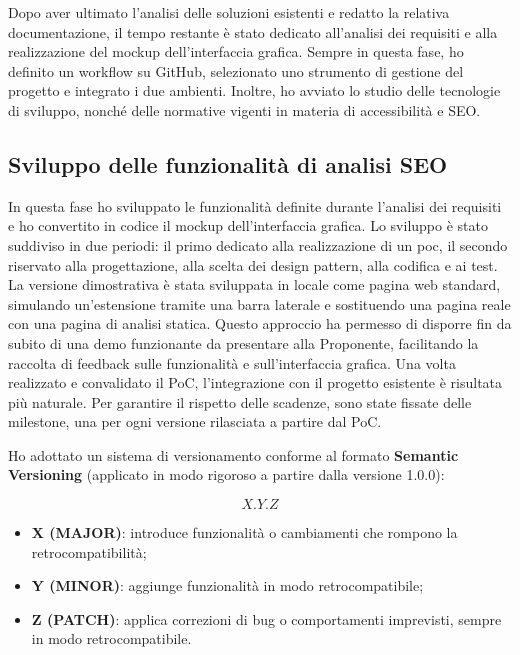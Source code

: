 \par\noindent Dopo aver ultimato l’analisi delle soluzioni esistenti e redatto la relativa documentazione, il tempo restante è stato dedicato all’analisi dei requisiti e alla realizzazione del mockup dell’interfaccia grafica. Sempre in questa fase, ho definito un workflow su GitHub, selezionato uno strumento di gestione del progetto e integrato i due ambienti. Inoltre, ho avviato lo studio delle tecnologie di sviluppo, nonché delle normative vigenti in materia di accessibilità e SEO.

\subsection{Sviluppo delle funzionalità di analisi SEO}

\par In questa fase ho sviluppato le funzionalità definite durante l’analisi dei requisiti e ho convertito in codice il mockup dell’interfaccia grafica. Lo sviluppo è stato suddiviso in due periodi: il primo dedicato alla realizzazione di un \gls{poc}, il secondo riservato alla progettazione, alla scelta dei design pattern, alla codifica e ai test. La versione dimostrativa è stata sviluppata in locale come pagina web standard, simulando un’estensione tramite una barra laterale e sostituendo una pagina reale con una pagina di analisi statica. Questo approccio ha permesso di disporre fin da subito di una demo funzionante da presentare alla Proponente, facilitando la raccolta di feedback sulle funzionalità e sull’interfaccia grafica. Una volta realizzato e convalidato il PoC, l’integrazione con il progetto esistente è risultata più naturale. Per garantire il rispetto delle scadenze, sono state fissate delle milestone, una per ogni versione rilasciata a partire dal PoC.

\vspace{10pt}
\par\noindent Ho adottato un sistema di versionamento conforme al formato \textbf{Semantic Versioning} (applicato in modo rigoroso a partire dalla versione 1.0.0):

\[
X.Y.Z
\]

\begin{itemize}
  \item \textbf{X (MAJOR)}: introduce funzionalità o cambiamenti che rompono  la retrocompatibilità;
  \item \textbf{Y (MINOR)}: aggiunge funzionalità in modo retrocompatibile;
  \item \textbf{Z (PATCH)}: applica correzioni di bug o comportamenti imprevisti, sempre in modo retrocompatibile.
\end{itemize}

